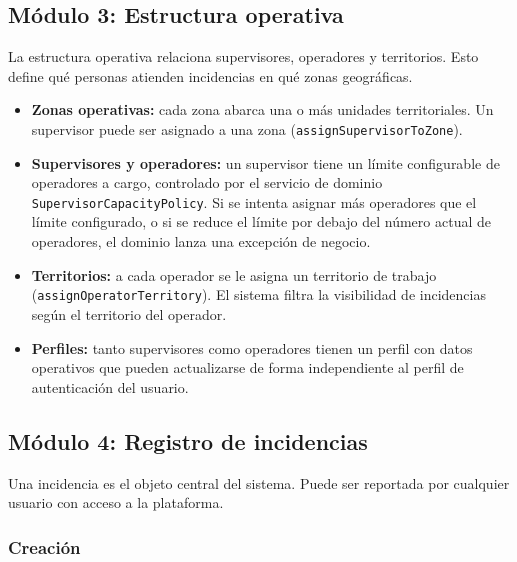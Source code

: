 \documentclass[12pt,a4paper]{article}
\begin{document}
\subsection{Módulo 3: Estructura operativa}

La estructura operativa relaciona supervisores, operadores y territorios. Esto
define qué personas atienden incidencias en qué zonas geográficas.

\begin{itemize}
    \item \textbf{Zonas operativas:} cada zona abarca una o más unidades
          territoriales. Un supervisor puede ser asignado a una zona
          (\texttt{assignSupervisorToZone}).
    \item \textbf{Supervisores y operadores:} un supervisor tiene un límite
          configurable de operadores a cargo, controlado por el servicio de dominio
          \texttt{SupervisorCapacityPolicy}. Si se intenta asignar más operadores
          que el límite configurado, o si se reduce el límite por debajo del número
          actual de operadores, el dominio lanza una excepción de negocio.
    \item \textbf{Territorios:} a cada operador se le asigna un territorio de
          trabajo (\texttt{assignOperatorTerritory}). El sistema filtra la
          visibilidad de incidencias según el territorio del operador.
    \item \textbf{Perfiles:} tanto supervisores como operadores tienen un perfil
          con datos operativos que pueden actualizarse de forma independiente al
          perfil de autenticación del usuario.
\end{itemize}

\subsection{Módulo 4: Registro de incidencias}

Una incidencia es el objeto central del sistema. Puede ser reportada por cualquier
usuario con acceso a la plataforma.

\subsubsection*{Creación}
\end{document}
